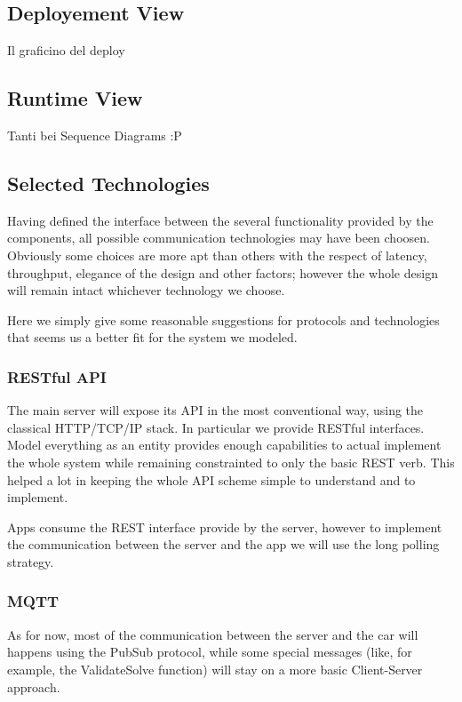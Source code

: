 \documentclass[11pt]{article} %
\begin{document}
\subsection{Deployement View}
Il graficino del deploy

\subsection{Runtime View}
Tanti bei Sequence Diagrams :P

\subsection{Selected Technologies}

Having defined the interface between the several functionality provided by the components, all possible communication technologies may have been choosen. Obviously some choices are more apt than others with the respect of latency, throughput, elegance of the design and other factors; however the whole design will remain intact whichever technology we choose.

Here we simply give some reasonable suggestions for protocols and technologies that seems us a better fit for the system we modeled.

\subsubsection{RESTful API}

The main server will expose its API in the most conventional way, using the classical HTTP/TCP/IP stack. In particular we provide RESTful interfaces. Model everything as an entity provides enough capabilities to actual implement the whole system while remaining constrainted to only the basic REST verb. This helped a lot in keeping the whole API scheme simple to understand and to implement.

Apps consume the REST interface provide by the server, however to implement the communication between the server and the app we will use the long polling strategy.

\subsubsection{MQTT}

As for now, most of the communication between the server and the car will happens using the PubSub protocol, while some special messages (like, for example, the ValidateSolve function) will stay on a more basic Client-Server approach.
\end{document}
